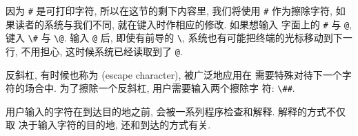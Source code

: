 因为 \verb'#' 是可打印字符, 所以在这节的剩下内容里, 我们将使用 \verb'#'
作为擦除字符, 如果读者的系统与我们不同, 就在键入时作相应的修改. 如果想输入
字面上的 \verb'#' 与 \verb'@', 键入 \verb'\#' 与 \verb'\@'. 输入 \verb'@'
后, 即使有前导的 \verb'\', 系统也有可能把终端的光标移动到下一行, 不用担心,
这时候系统已经读取到了 \verb'@'.

反斜杠, 有时候也称为  (escape character), 被广泛地应用在
需要特殊对待下一个字符的场合中. 为了擦除一个反斜杠, 用户需要输入两个擦除字
符: \verb'\##'.

用户输入的字符在到达目的地之前, 会被一系列程序检查和解释. 解释的方式不仅取
决于输入字符的目的地, 还和到达的方式有关.
